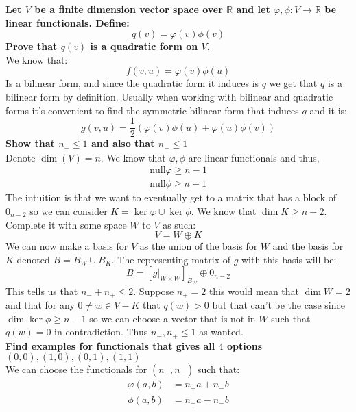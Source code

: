 \documentclass[11pt,a4paper]{article}
\theoremstyle{plain}
\newcommand{\R}{\mathbb{R}}
\begin{document}
	\newpage
	\noindent
	\textbf{Let $V$ be a finite dimension vector space over $\R$ and let
	$\varphi,\phi \colon V \to \R$ be linear functionals. Define:
	\[
		q(v) = \varphi(v)\phi(v)
	\]
	Prove that $q(v)$ is a quadratic form on $V$.} \\
	We know that:
	\[
		f(v,u) = \varphi(v)\phi(u)
	\]
	Is a bilinear form, and since the quadratic form it induces is $q$ we get
	that $q$ is a bilinear form by definition. Usually when working with
	bilinear and quadratic forms it's convenient to find the symmetric bilinear
	form that induces $q$ and it is:
	\[
		g(v,u) = \frac 12 \left(\varphi(v)\phi(u) + \varphi(u)\phi(v)\right)
	\]
	\textbf{Show that $n_+ \le 1$ and also that $n_- \le 1$} \\
	Denote $\dim(V) = n$. We know that $\varphi,\phi$ are linear functionals
	and thus, 
	\begin{align*}
		\mathrm{null} \varphi \geq n - 1 \\
		\mathrm{null} \phi \geq n - 1
	\end{align*}
	The intuition is that we want to eventually get to a matrix that has a 
	block of $0_{n-2}$ so we can consider $K = \ker \varphi \cup \ker \phi$. 
	We know that $\dim K \geq n - 2$. Complete it with some space $W$ to $V$ 
	as such:
	\[
		V = W \oplus K
	\]
	We can now make a basis for $V$ as the union of the basis for $W$ and the
	basis for $K$ denoted $B= B_W \cup B_K$. The representing matrix of $g$
	with this basis will be:
	\[
		B = [g|_{W \times W}]_{B_W} \oplus 0_{n - 2}
	\]
	This tells us that $n_- + n_+ \le 2$. Suppose $n_+ = 2$ this would mean
	that $\dim W = 2$ and that for any $0 \neq w\in V - K$ that $q(w) > 0$
	but that can't be the case since $\dim \ker \phi \geq n-1$ so we can
	choose a vector that is not in $W$ such that $q(w) = 0$ in contradiction.
	Thus $n_-,n_+ \le 1$ as wanted. \\
	\textbf{Find examples for functionals that gives all $4$ options $(0,0),
	(1,0),(0,1),(1,1)$} \\
	We can choose the functionals for $(n_+,n_-)$ such that:
	\begin{align*}
		\varphi(a,b) &= n_+a + n_-b \\
		\phi(a,b) &= n_+a - n_-b
	\end{align*}
	
\end{document}
